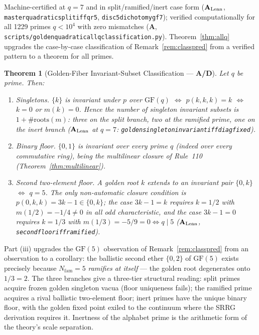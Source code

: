 \documentclass[11pt]{article}
\newtheorem{theorem}{Theorem}[section]
\theoremstyle{remark}
\newcommand{\GF}[1]{\ensuremath{\mathrm{GF}(#1)}}
\newcommand{\lean}[1]{%
  \penalty-100
  \begingroup\def\_{\textunderscore\allowbreak}\texttt{#1}\endgroup}
\newcommand{\CatA}{\textbf{A}}
\newcommand{\CatAL}{\texorpdfstring{\ensuremath{\textbf{A}_{\rm Lean}}}{A-Lean}}
\newcommand{\CatAD}{\textbf{A/D}}
\begin{document}
Machine-certified at $q = 7$ and in split/ramified/inert case form
(\CatAL{}, \lean{master\_quadratic\_split\_iff\_qr5},
\lean{disc5\_dichotomy\_gf7}); verified computationally for all 1229 primes
$q < 10^4$ with zero mismatches (\CatA{}, \lean{scripts/golden\_quadratic\_all\_q\_classification.py}).
Theorem~\ref{thm:allq} upgrades the case-by-case classification of
Remark~\ref{rem:classpred} from a verified pattern to a theorem for all
primes.

\begin{theorem}[Golden-Fiber Invariant-Subset Classification --- \CatAD{}]
\label{thm:goldenfiber}
Let $q$ be prime. Then:
\begin{enumerate}[leftmargin=2em,itemsep=2pt,topsep=2pt,label=(\roman*)]
  \item \emph{Singletons.} $\{k\}$ is invariant under $p$ over $\GF{q}$
    $\iff$ $p(k,k,k) = k$ $\iff$ $k = 0$ or $m(k) = 0$. Hence the number of
    singleton invariant subsets is $1 + \#\mathrm{roots}(m)$: three on the
    split branch, two at the ramified prime, one on the inert branch
    (\CatAL{} at $q=7$:
    \lean{golden\_singleton\_invariant\_iff\_diag\_fixed}).
  \item \emph{Binary floor.} $\{0,1\}$ is invariant over every prime $q$
    (indeed over every commutative ring), being the multilinear closure of
    Rule~110 (Theorem~\ref{thm:multilinear}).
  \item \emph{Second two-element floor.} A golden root $k$ extends to an
    invariant pair $\{0,k\}$ $\iff$ $q = 5$. The only non-automatic closure
    condition is $p(0,k,k) = 3k - 1 \in \{0,k\}$; the case $3k-1 = k$
    requires $k = 1/2$ with $m(1/2) = -1/4 \neq 0$ in all odd
    characteristic, and the case $3k-1 = 0$ requires $k = 1/3$ with
    $m(1/3) = -5/9 = 0 \iff q \mid 5$
    (\CatAL{}, \lean{second\_floor\_iff\_ramified}).
\end{enumerate}
\end{theorem}

Part (iii) upgrades the $\GF{5}$ observation of Remark~\ref{rem:classpred}
from an observation to a corollary: the ballistic second ether $\{0,2\}$ of
$\GF{5}$ exists precisely because $N_{\mathrm{fam}} = 5$ \emph{ramifies at
itself} --- the golden root degenerates onto $1/3 = 2$. The three branches
give a three-tier structural reading: split primes acquire frozen golden
singleton vacua (floor uniqueness fails); the ramified prime acquires a
rival ballistic two-element floor; inert primes have the unique binary
floor, with the golden fixed point exiled to the continuum where the SRRG
derivation requires it. Inertness of the alphabet prime is the arithmetic
form of the theory's scale separation.
\end{document}
